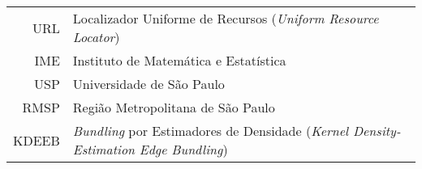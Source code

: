 {
\raggedbottom



\begin{tabular}{rl}
	URL          & Localizador Uniforme de Recursos (\emph{Uniform Resource Locator})\\
	IME          & Instituto de Matemática e Estatística\\
	USP          & Universidade de São Paulo\\
  RMSP         & Região Metropolitana de São Paulo\\
	KDEEB        & \emph{Bundling} por Estimadores de Densidade (\emph{Kernel Density-Estimation Edge Bundling})
\end{tabular}

%



\disablenewpage{\listoffigures}

\disablenewpage{\listoftables}



\tableofcontents

} %

